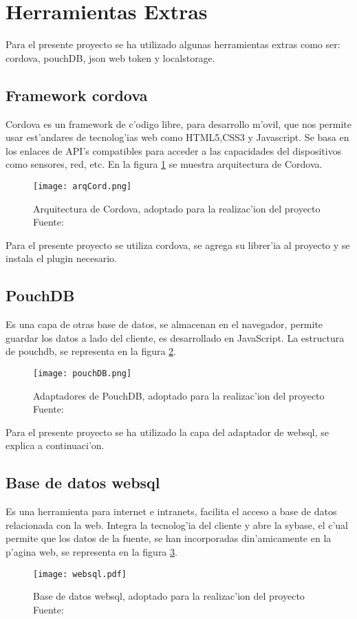 \section{Herramientas Extras}
\label{HerramientasExtras}
Para el presente proyecto se ha utilizado algunas herramientas extras como ser: cordova, pouchDB, json web token y localstorage.

\subsection{Framework cordova}
Cordova es un framework de c'odigo libre, para desarrollo m'ovil, que nos permite usar est'andares de tecnolog'ias web como HTML5,CSS3 y Javascript. Se basa en  los enlaces de API's compatibles para acceder a las capacidades del dispositivos como sensores, red, etc. En la figura \ref{fig:arqCordova} se muestra arquitectura de Cordova.

\begin{figure}[H]
\centering
\texttt{[image: arqCord.png]}
\captionsetup{justification=centering,margin=2cm}
\caption{Arquitectura de Cordova, adoptado para la realizac'ion del proyecto Fuente: \cite{Cantabriatic}}
\label{fig:arqCordova}
\end{figure}

Para el presente proyecto se utiliza cordova, se agrega su librer'ia al proyecto y se instala el plugin necesario.

\subsection{PouchDB}
Es una capa de otras base de datos, se almacenan en el navegador, permite guardar los datos a lado del cliente,  es desarrollado en JavaScript. La estructura de pouchdb, se representa en la figura \ref{fig:pouchDB}. 
\begin{figure}[H]
\centering
\texttt{[image: pouchDB.png]}
\captionsetup{justification=centering,margin=2cm}
\caption{Adaptadores de PouchDB, adoptado para la realizac'ion del proyecto Fuente: \cite{Pouch}}
\label{fig:pouchDB}
\end{figure}

Para el presente proyecto se ha utilizado la capa del adaptador de websql, se explica a continuaci'on.
\subsection{Base de datos websql}
Es una herramienta para internet e intranets, facilita el acceso a base de datos relacionada con la web. Integra la tecnolog'ia  del cliente y abre la sybase, el c'ual permite que los datos de la fuente, se han incorporadas din'amicamente en la p'agina web, se representa en la figura \ref{fig:websql}.
\begin{figure}[H]
\centering
\texttt{[image: websql.pdf]}
\captionsetup{justification=centering,margin=2cm}
\caption{Base de datos websql, adoptado para la realizac'ion del proyecto Fuente: \cite{Websql1997}}
\label{fig:websql}
\end{figure}

